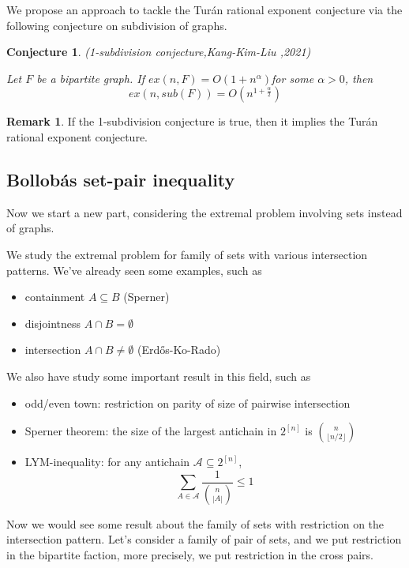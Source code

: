 \documentclass{article}
\newtheorem{conjecture}[theorem]{Conjecture}
\theoremstyle{definition}
\newtheorem{remark}[theorem]{Remark}
\def\Erdos{Erd\H{o}s}
\def\Turan{Tur\'an}
\begin{document}
We propose an approach to tackle the \Turan{} rational exponent conjecture via the following conjecture on subdivision of graphs.

\begin{conjecture}{(1-subdivision conjecture,Kang-Kim-Liu \cite{KANG2021149},2021)}

    Let $F$ be a bipartite graph. If $ex(n,F)=O(1+n^\alpha)$for some $\alpha>0$, then $$ex(n,sub(F))=O(n^{1+\frac{\alpha}{2}})$$
    
\end{conjecture}

\begin{remark}
    If the 1-subdivision conjecture is true, then it implies the \Turan{} rational exponent conjecture.
\end{remark}

\subsection{Bollob\'as set-pair inequality}

Now we start a new part, considering the extremal problem involving sets instead of graphs.

We study the extremal problem for family of sets with various intersection patterns.
We've already seen some examples, such as 
\begin{itemize}
    \item containment $A \subseteq B$ (Sperner)
    \item disjointness $A \cap B = \emptyset$
    \item intersection $A \cap B \neq \emptyset$ (\Erdos{}-Ko-Rado)
\end{itemize}

We also have study some important result in this field, such as 

\begin{itemize}
    \item odd/even town: restriction on parity of size of pairwise intersection
    \item Sperner theorem: the size of the largest antichain in $2^{[n]}$ is $\binom{n}{\lfloor n/2\rfloor}$
    \item LYM-inequality: for any antichain $\mathcal{A} \subseteq 2^{\left [ n \right ] }$,$$\sum_{A\in \mathcal{A}} \frac{1}{\binom{n}{\left | A \right | }} \le 1$$
\end{itemize}

Now we would see some result about the family of sets with restriction on the intersection pattern.
Let's consider a family of pair of sets, and we put restriction in the bipartite faction, more precisely, we put restriction in the cross pairs. 
\end{document}
